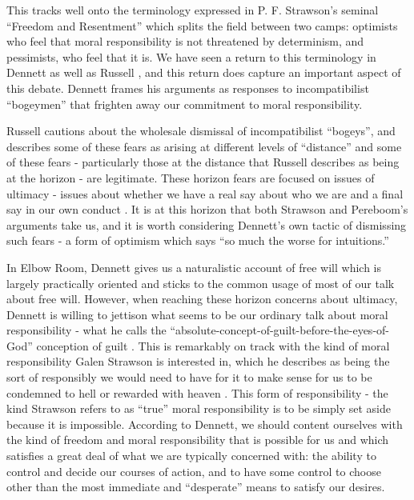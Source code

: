 \documentclass[phd,12pt,oneside,paper=letterpaper]{ubcthesis}
\begin{document}
This tracks well onto the terminology expressed in P. F. Strawson's seminal ``Freedom and Resentment'' which splits the field between two camps: optimists who feel that moral responsibility is not threatened by determinism, and pessimists, who feel that it is. We have seen a return to this terminology in Dennett \citeyearpar{dennett1984} as well as Russell \citeyearpar{russell2002}, and this return does capture an important aspect of this debate. Dennett frames his arguments as responses to incompatibilist ``bogeymen'' that frighten away our commitment to moral responsibility.

Russell cautions about the wholesale dismissal of incompatibilist ``bogeys'', and describes some of these fears as arising at different levels of ``distance'' and some of these fears - particularly those at the distance that Russell describes as being at the horizon - are legitimate. These horizon fears are focused on issues of ultimacy - issues about whether we have a real say about who we are and a final say in our own conduct \citep{russell2002}. It is at this horizon that both Strawson and Pereboom's arguments take us, and it is worth considering Dennett's own tactic of dismissing such fears - a form of optimism which says ``so much the worse for intuitions.''

In Elbow Room, Dennett gives us a naturalistic account of free will which is largely practically oriented and sticks to the common usage of most of our talk about free will. However, when reaching these horizon concerns about ultimacy, Dennett is willing to jettison what seems to be our ordinary talk about moral responsibility - what he calls the ``absolute-concept-of-guilt-before-the-eyes-of-God'' conception of guilt \citep[p.166]{dennett1984}. This is remarkably on track with the kind of moral responsibility Galen Strawson is interested in, which he describes as being the sort of responsibly we would need to have for it to make sense for us to be condemned to hell or rewarded with heaven \citep[p.2]{strawsong2010}. This form of responsibility - the kind Strawson refers to as ``true'' moral responsibility is to be simply set aside because it is impossible. According to Dennett, we should content ourselves with the kind of freedom and moral responsibility that is possible for us and which satisfies a great deal of what we are typically concerned with: the ability to control and decide our courses of action, and to have some control to choose other than the most immediate and ``desperate'' means to satisfy our desires. 
\end{document}
